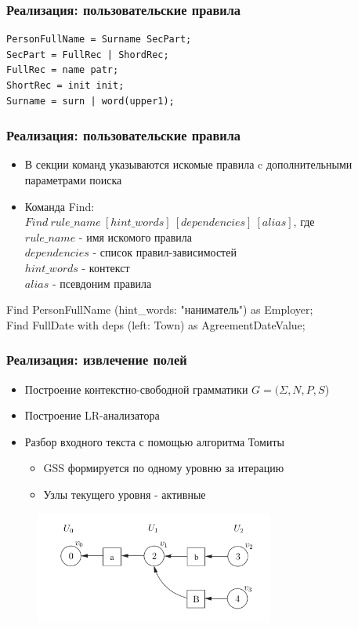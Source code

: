 \documentclass[10pt]{beamer}
\begin{document}
\begin{frame}[fragile]
\frametitle{Реализация: пользовательские правила}
\begin{example}
\begin{verbatim}
PersonFullName = Surname SecPart;
SecPart = FullRec | ShordRec;
FullRec = name patr;
ShortRec = init init;
Surname = surn | word(upper1);
\end{verbatim}
\end{example}
\end{frame}

\begin{frame}[fragile]
\frametitle{Реализация: пользовательские правила}
\begin{itemize}
	\item В секции команд указываются искомые правила c дополнительными параметрами поиска
	\item Команда Find:\\ 
	$Find\ rule\_name\ [hint\_words]\ [dependencies]\ [alias]$, где\\
	$rule\_name$ - имя искомого правила\\
	$dependencies$ - список правил-зависимостей\\
	$hint\_words$ - контекст\\
	$alias$ - псевдоним правила
\end{itemize}
\begin{example}
Find PersonFullName (hint\_words: "наниматель") as Employer;\\
Find FullDate with deps (left: Town) as AgreementDateValue;
\end{example}
\end{frame}

\begin{frame}
\frametitle{Реализация: извлечение полей}
\begin{itemize}
	\item Построение контекстно-свободной грамматики $G = (\Sigma, N, P, S$)
	\item Построение LR-анализатора
	\item Разбор входного текста с помощью алгоритма Томиты
	\begin{itemize}
		\item GSS формируется по одному уровню за итерацию
		\item Узлы текущего уровня - активные
	\end{itemize}
\end{itemize}
\begin{figure}%
\centering
\includegraphics[width=0.7\textwidth]{img/gss-step3.png}
\end{figure}
\end{frame}
\end{document}

